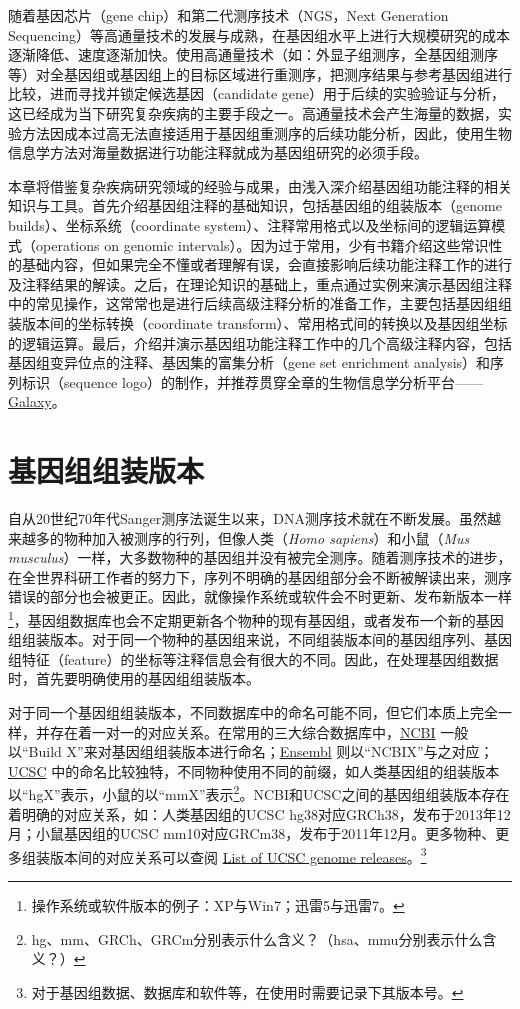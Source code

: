 \documentclass[11pt,a4paper,twoside]{book}
\begin{document}
随着基因芯片（gene chip）和第二代测序技术（NGS，Next Generation Sequencing）等高通量技术的发展与成熟，在基因组水平上进行大规模研究的成本逐渐降低、速度逐渐加快。使用高通量技术（如：外显子组测序，全基因组测序等）对全基因组或基因组上的目标区域进行重测序，把测序结果与参考基因组进行比较，进而寻找并锁定候选基因（candidate gene）用于后续的实验验证与分析，这已经成为当下研究复杂疾病的主要手段之一。高通量技术会产生海量的数据，实验方法因成本过高无法直接适用于基因组重测序的后续功能分析，因此，使用生物信息学方法对海量数据进行功能注释就成为基因组研究的必须手段。

本章将借鉴复杂疾病研究领域的经验与成果，由浅入深介绍基因组功能注释的相关知识与工具。首先介绍基因组注释的基础知识，包括基因组的组装版本（genome builds）、坐标系统（coordinate system）、注释常用格式以及坐标间的逻辑运算模式（operations on genomic intervals）。因为过于常用，少有书籍介绍这些常识性的基础内容，但如果完全不懂或者理解有误，会直接影响后续功能注释工作的进行及注释结果的解读。之后，在理论知识的基础上，重点通过实例来演示基因组注释中的常见操作，这常常也是进行后续高级注释分析的准备工作，主要包括基因组组装版本间的坐标转换（coordinate transform）、常用格式间的转换以及基因组坐标的逻辑运算。最后，介绍并演示基因组功能注释工作中的几个高级注释内容，包括基因组变异位点的注释、基因集的富集分析（gene set enrichment analysis）和序列标识（sequence logo）的制作，并推荐贯穿全章的生物信息学分析平台—— \href{http://galaxyproject.org}{Galaxy}。

\section{基因组组装版本}
自从20世纪70年代Sanger测序法诞生以来，DNA测序技术就在不断发展。虽然越来越多的物种加入被测序的行列，但像人类（\textit{Homo sapiens}）和小鼠（\textit{Mus musculus}）一样，大多数物种的基因组并没有被完全测序。随着测序技术的进步，在全世界科研工作者的努力下，序列不明确的基因组部分会不断被解读出来，测序错误的部分也会被更正。因此，就像操作系统或软件会不时更新、发布新版本一样\footnote{操作系统或软件版本的例子：XP与Win7；迅雷5与迅雷7。}，基因组数据库也会不定期更新各个物种的现有基因组，或者发布一个新的基因组组装版本。对于同一个物种的基因组来说，不同组装版本间的基因组序列、基因组特征（feature）的坐标等注释信息会有很大的不同。因此，在处理基因组数据时，首先要明确使用的基因组组装版本。

对于同一个基因组组装版本，不同数据库中的命名可能不同，但它们本质上完全一样，并存在着一对一的对应关系。在常用的三大综合数据库中，\href{http://www.ncbi.nlm.nih.gov}{NCBI} 一般以“Build X”来对基因组组装版本进行命名；\href{http://www.ensembl.org/index.html}{Ensembl} 则以“NCBIX”与之对应；\href{http://genome.ucsc.edu}{UCSC} 中的命名比较独特，不同物种使用不同的前缀，如人类基因组的组装版本以“hgX”表示，小鼠的以“mmX”表示\footnote{hg、mm、GRCh、GRCm分别表示什么含义？（hsa、mmu分别表示什么含义？）}。NCBI和UCSC之间的基因组组装版本存在着明确的对应关系，如：人类基因组的UCSC hg38对应GRCh38，发布于2013年12月；小鼠基因组的UCSC mm10对应GRCm38，发布于2011年12月。更多物种、更多组装版本间的对应关系可以查阅 \href{http://genome.ucsc.edu/FAQ/FAQreleases.html\#release1}{List of UCSC genome releases}。\footnote{对于基因组数据、数据库和软件等，在使用时需要记录下其版本号。}
\end{document}
